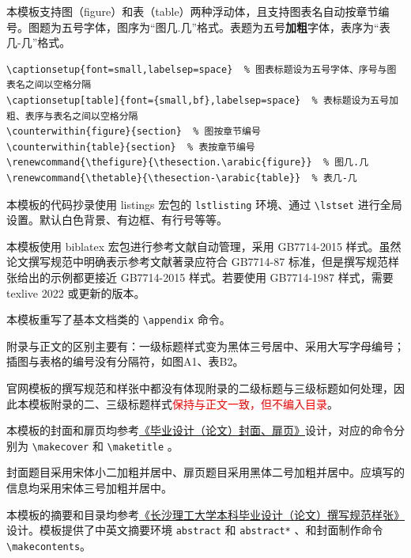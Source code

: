 本模板支持图（figure）和表（table）两种浮动体，且支持图表名自动按章节编号。图题为五号字体，图序为“图几.几”格式。表题为五号\textbf{加粗}字体，表序为“表几-几”格式。

\begin{lstlisting}[numbers=none]
\captionsetup{font=small,labelsep=space}  % 图表标题设为五号字体、序号与图表名之间以空格分隔
\captionsetup[table]{font={small,bf},labelsep=space}  % 表标题设为五号加粗、表序与表名之间以空格分隔
\counterwithin{figure}{section}  % 图按章节编号
\counterwithin{table}{section}  % 表按章节编号
\renewcommand{\thefigure}{\thesection.\arabic{figure}}  % 图几.几
\renewcommand{\thetable}{\thesection-\arabic{table}}  % 表几-几
\end{lstlisting}

本模板的代码抄录使用 listings 宏包的 \verb!lstlisting! 环境、通过 \verb!\lstset! 进行全局设置。默认白色背景、有边框、有行号等等。

本模板使用 biblatex 宏包进行参考文献自动管理，采用 GB7714-2015 样式。虽然论文撰写规范中明确表示参考文献著录应符合 GB7714-87 标准，但是撰写规范样张给出的示例都更接近 GB7714-2015 样式。若要使用 GB7714-1987 样式，需要 texlive 2022 或更新的版本。

本模板重写了基本文档类的 \verb!\appendix! 命令。

附录与正文的区别主要有：一级标题样式变为黑体三号居中、采用大写字母编号；插图与表格的编号没有分隔符，如图A1、表B2。

官网模板的撰写规范和样张中都没有体现附录的二级标题与三级标题如何处理，因此本模板附录的二、三级标题样式\textcolor{red}{保持与正文一致，但不编入目录}。

本模板的封面和扉页均参考\href{https://www.csust.edu.cn/jwc/info/1142/3596.htm}{《毕业设计（论文）封面、扉页》}设计，对应的命令分别为 \verb!\makecover! 和 \verb!\maketitle! 。

封面题目采用宋体小二加粗并居中、扉页题目采用黑体二号加粗并居中。应填写的信息均采用宋体三号加粗并居中。

本模板的摘要和目录均参考\href{https://www.csust.edu.cn/jwc/info/1142/3595.htm}{《长沙理工大学本科毕业设计（论文）撰写规范样张》}设计。模板提供了中英文摘要环境 \verb!abstract! 和 \verb!abstract*! 、和封面制作命令 \verb!\makecontents!。

